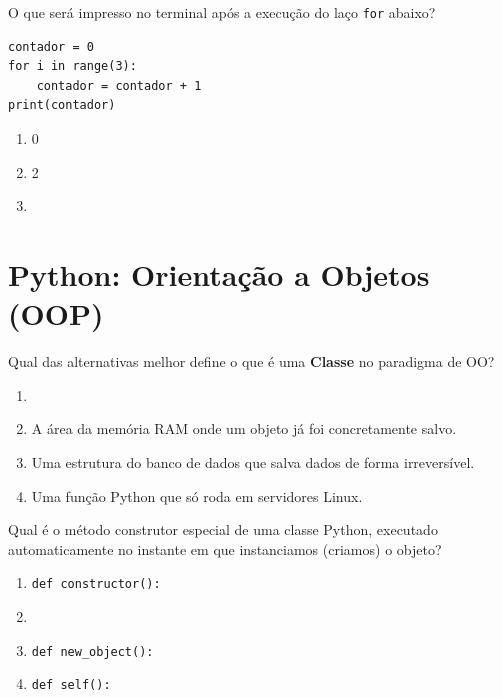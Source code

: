 \documentclass[12pt,a4paper]{article}
\newcommand{\correto}[1]{\iftoggle{gabarito}{\textbf{\color{corGabarito}#1}}{#1}}
\begin{document}
\begin{tcolorbox}[colback=azulTitulo!5, colframe=azulTitulo, title=Questão 10]
    O que será impresso no terminal após a execução do laço \texttt{for} abaixo?
\begin{verbatim}
contador = 0
for i in range(3):
    contador = contador + 1
print(contador)
\end{verbatim}
    \begin{enumerate}[label=\alph*)]
        \item 0
        \item 2
        \item \correto{3}
    \end{enumerate}
\end{tcolorbox}


\newpage
\section{Python: Orientação a Objetos (OOP)}

\begin{tcolorbox}[colback=white, colframe=azulTitulo, title=Questão 11]
    Qual das alternativas melhor define o que é uma \textbf{Classe} no paradigma de OO?
    \begin{enumerate}[label=\alph*)]
        \item \correto{Um molde ou diagrama lógico que define as propriedades e comportamentos que um futuro objeto terá.}
        \item A área da memória RAM onde um objeto já foi concretamente salvo.
        \item Uma estrutura do banco de dados que salva dados de forma irreversível.
        \item Uma função Python que só roda em servidores Linux.
    \end{enumerate}
\end{tcolorbox}

\begin{tcolorbox}[colback=white, colframe=azulTitulo, title=Questão 12]
    Qual é o método construtor especial de uma classe Python, executado automaticamente no instante em que instanciamos (criamos) o objeto?
    \begin{enumerate}[label=\alph*)]
        \item \texttt{def constructor():}
        \item \correto{\texttt{def \_\_init\_\_(self):}}
        \item \texttt{def new\_object():}
        \item \texttt{def self():}
    \end{enumerate}
\end{tcolorbox}
\end{document}
